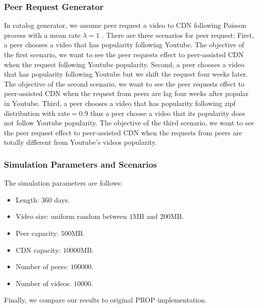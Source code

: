 \documentclass[10pt,final,journal,a4paper]{IEEEtran}
\begin{document}
\subsubsection{Peer Request Generator}\label{peerrequest}
In catalog generator, we assume peer request a video to CDN following Poisson process with a mean rate $\lambda=1$ \cite{Zink:2009:CYN:1502814.1502987}.
There are three scenarios for peer request:
First, a peer chooses a video that has popularity following Youtube.
The objective of the first scenario, we want to see the peer requests effect to peer-assisted CDN when the request following Youtube popularity. 
Second, a peer chooses a video that has popularity following Youtube but we shift the request four weeks later.  
The objective of the second scenario, we want to see the peer requests effect to peer-assisted CDN when the request from peers are lag four weeks after popular in Youtube.
Third, a peer chooses a video that has popularity following zipf distribution with rate$=0.9$ \cite{6654887} thus a peer choose a video that its popularity does not follow Youtube popularity.
The objective of the third scenario, we want to see the peer request effect to peer-assisted CDN when the requests from peers are totally different from Youtube's videos popularity.



\subsubsection{Simulation Parameters and Scenarios}
The simulation parameters are follows:

\begin{itemize}
\item Length: $360$ days.
\item Video size: uniform random between $1$MB and $200$MB.
\item Peer capacity: $500$MB.
\item CDN capacity: $10000$MB.
\item Number of peers: $100000$.
\item Number of videos: $10000$.
\end{itemize}
Finally, we compare our results to original PROP \cite{1613869} implementation.

\end{document}
